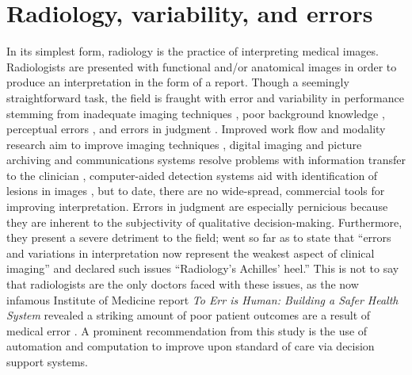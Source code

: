 \section{Radiology, variability, and errors}
In its simplest form, radiology is the practice of interpreting medical images. 
Radiologists are presented with functional and/or anatomical images in order to produce an interpretation in the form of a report. 
Though a seemingly straightforward task, the field is fraught with error and variability in performance \cite{Fitzgerald:2001hn} stemming from inadequate imaging techniques \cite{Berlin:1996ib}, poor background knowledge \cite{Berlin:1996ei}, perceptual errors \cite{Berlin:1_mkt9li}, and errors in judgment \cite{Berlin:1996vw}.
Improved work flow and modality research aim to improve imaging techniques \cite{Noumeir:2006cb}, digital imaging and picture archiving and communications systems resolve problems with information transfer to the clinician \cite{Strickland:2000cv,Bryan:1999kn}, computer-aided detection systems aid with identification of lesions in images \cite{Oliver:2010fm}, but to date, there are no wide-spread, commercial tools for improving interpretation.
Errors in judgment are especially pernicious because they are inherent to the subjectivity of qualitative decision-making.
Furthermore, they present a severe detriment to the field;  went so far as to state that ``errors and variations in interpretation now represent the weakest aspect of clinical imaging'' and declared such issues ``Radiology's Achilles' heel.'' 
This is not to say that radiologists are the only doctors faced with these issues, as the now infamous Institute of Medicine report \emph{To Err is Human: Building a Safer Health System} revealed a striking amount of poor patient outcomes are a result of medical error \cite{Anonymous:2000va}.
A prominent recommendation from this study is the use of automation and computation to improve upon standard of care via decision support systems.

